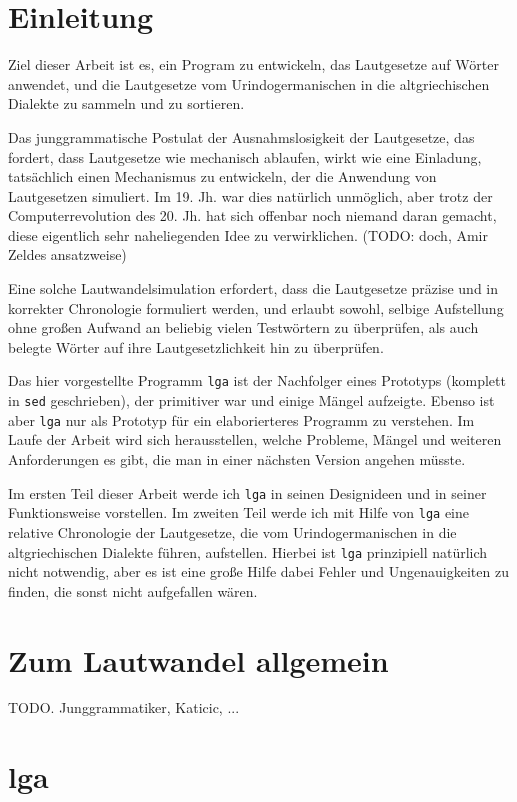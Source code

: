\documentclass[12pt,a4paper,normalheadings]{scrartcl}
\def\tt#1{\texttt{#1}}
\begin{document}
\onehalfspacing

\section{Einleitung}

Ziel dieser Arbeit ist es, ein Program zu entwickeln,
das Lautgesetze auf Wörter anwendet,
und die Lautgesetze vom Urindogermanischen in die altgriechischen Dialekte
zu sammeln und zu sortieren.

Das junggrammatische Postulat der Ausnahmslosigkeit der Lautgesetze,
das fordert, dass Lautgesetze wie mechanisch ablaufen,
wirkt wie eine Einladung,
tatsächlich einen Mechanismus zu entwickeln,
der die Anwendung von Lautgesetzen simuliert.
Im 19. Jh. war dies natürlich unmöglich,
aber trotz der Computerrevolution des 20. Jh. hat sich offenbar
noch niemand daran gemacht,
diese eigentlich sehr naheliegenden Idee zu verwirklichen.
(TODO: doch, Amir Zeldes ansatzweise)

Eine solche Lautwandelsimulation erfordert,
dass die Lautgesetze präzise und in korrekter Chronologie formuliert werden,
und erlaubt sowohl,
selbige Aufstellung ohne großen Aufwand an beliebig vielen Testwörtern
zu überprüfen,
als auch belegte Wörter auf ihre Lautgesetzlichkeit hin zu überprüfen.

Das hier vorgestellte Programm \tt{lga} ist
der Nachfolger eines Prototyps
(komplett in \tt{sed} geschrieben),
der primitiver war und einige Mängel aufzeigte.
Ebenso ist aber \tt{lga} nur als Prototyp
für ein elaborierteres Programm zu verstehen.
Im Laufe der Arbeit wird sich herausstellen,
welche Probleme, Mängel und weiteren Anforderungen es gibt,
die man in einer nächsten Version angehen müsste.

Im ersten Teil dieser Arbeit werde ich \tt{lga}
in seinen Designideen und in seiner Funktionsweise vorstellen.
Im zweiten Teil werde ich mit Hilfe von \tt{lga} eine relative Chronologie der
Lautgesetze, die vom Urindogermanischen in die altgriechischen Dialekte führen,
aufstellen.
Hierbei ist \tt{lga} prinzipiell natürlich nicht notwendig,
aber es ist eine große Hilfe dabei Fehler und Ungenauigkeiten zu finden,
die sonst nicht aufgefallen wären.

\section{Zum Lautwandel allgemein}
TODO. Junggrammatiker, Katicic, ...

\section{lga}
\end{document}
